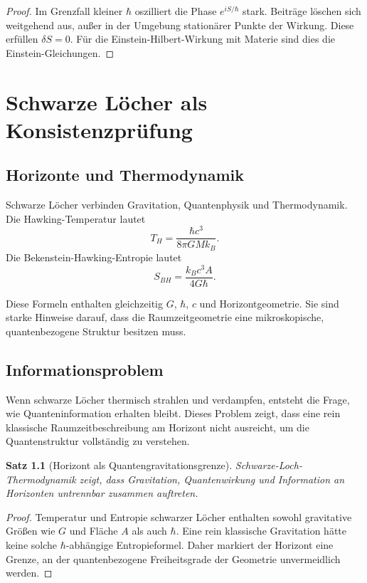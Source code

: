 \documentclass[11pt,a4paper]{book}
\newtheorem{satz}{Satz}[chapter]
\theoremstyle{remark}
\begin{document}
\begin{proof}
Im Grenzfall kleiner $\hbar$ oszilliert die Phase $e^{iS/\hbar}$ stark. Beiträge löschen sich weitgehend aus, außer in der Umgebung stationärer Punkte der Wirkung. Diese erfüllen $\delta S=0$. Für die Einstein-Hilbert-Wirkung mit Materie sind dies die Einstein-Gleichungen.
\end{proof}

\chapter{Schwarze Löcher als Konsistenzprüfung}
\section{Horizonte und Thermodynamik}
Schwarze Löcher verbinden Gravitation, Quantenphysik und Thermodynamik. Die Hawking-Temperatur lautet
\begin{equation}
T_H=\frac{\hbar c^3}{8\pi G M k_B}.
\end{equation}
Die Bekenstein-Hawking-Entropie lautet
\begin{equation}
S_{BH}=\frac{k_B c^3 A}{4G\hbar}.
\end{equation}

Diese Formeln enthalten gleichzeitig $G$, $\hbar$, $c$ und Horizontgeometrie. Sie sind starke Hinweise darauf, dass die Raumzeitgeometrie eine mikroskopische, quantenbezogene Struktur besitzen muss.

\section{Informationsproblem}
Wenn schwarze Löcher thermisch strahlen und verdampfen, entsteht die Frage, wie Quanteninformation erhalten bleibt. Dieses Problem zeigt, dass eine rein klassische Raumzeitbeschreibung am Horizont nicht ausreicht, um die Quantenstruktur vollständig zu verstehen.

\begin{satz}[Horizont als Quantengravitationsgrenze]
Schwarze-Loch-Thermodynamik zeigt, dass Gravitation, Quantenwirkung und Information an Horizonten untrennbar zusammen auftreten.
\end{satz}

\begin{proof}
Temperatur und Entropie schwarzer Löcher enthalten sowohl gravitative Größen wie $G$ und Fläche $A$ als auch $\hbar$. Eine rein klassische Gravitation hätte keine solche $\hbar$-abhängige Entropieformel. Daher markiert der Horizont eine Grenze, an der quantenbezogene Freiheitsgrade der Geometrie unvermeidlich werden.
\end{proof}
\end{document}
